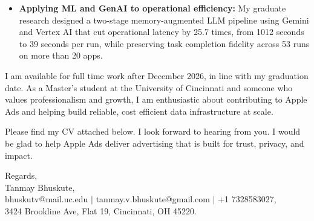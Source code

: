 \documentclass[11pt]{letter}
\begin{document}
\begin{letter}{}
\begin{itemize}[leftmargin=*, itemsep=0.45em]
    \item \textbf{Applying ML and GenAI to operational efficiency:} My graduate research designed a two-stage memory-augmented LLM pipeline using Gemini and Vertex AI that cut operational latency by 25.7 times, from 1012 seconds to 39 seconds per run, while preserving task completion fidelity across 53 runs on more than 20 apps.
\end{itemize}

I am available for full time work after December 2026, in line with my graduation date. As a Master's student at the University of Cincinnati and someone who values professionalism and growth, I am enthusiastic about contributing to Apple Ads and helping build reliable, cost efficient data infrastructure at scale.

Please find my CV attached below. I look forward to hearing from you. I would be glad to help Apple Ads deliver advertising that is built for trust, privacy, and impact.

{\setlength{\parskip}{0pt}
Regards,\\
Tanmay Bhuskute,\\
bhuskutv@mail.uc.edu $\mid$ tanmay.v.bhuskute@gmail.com $\mid$ +1 7328583027,\\
3424 Brookline Ave, Flat 19, Cincinnati, OH 45220.
}

\end{letter}
\end{document}
